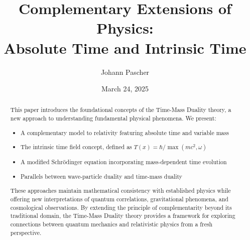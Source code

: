 \documentclass[a4paper,12pt]{article}
\newcommand{\Tfield}{T(x)}
\begin{document}
	
	\title{Complementary Extensions of Physics: \\ Absolute Time and Intrinsic Time}
	\author{Johann Pascher}
	\date{March 24, 2025}
	\maketitle
	
	\begin{abstract}
		This paper introduces the foundational concepts of the Time-Mass Duality theory, a new approach to understanding fundamental physical phenomena. We present:
		
		\begin{itemize}[leftmargin=*,nosep]
			\item A complementary model to relativity featuring absolute time and variable mass
			\item The intrinsic time field concept, defined as \(\Tfield = \hbar/\max(mc^2, \omega)\)
			\item A modified Schrödinger equation incorporating mass-dependent time evolution
			\item Parallels between wave-particle duality and time-mass duality
		\end{itemize}
		
		These approaches maintain mathematical consistency with established physics while offering new interpretations of quantum correlations, gravitational phenomena, and cosmological observations. By extending the principle of complementarity beyond its traditional domain, the Time-Mass Duality theory provides a framework for exploring connections between quantum mechanics and relativistic physics from a fresh perspective.
	\end{abstract}
	
	\tableofcontents
	\newpage
	
\end{document}
